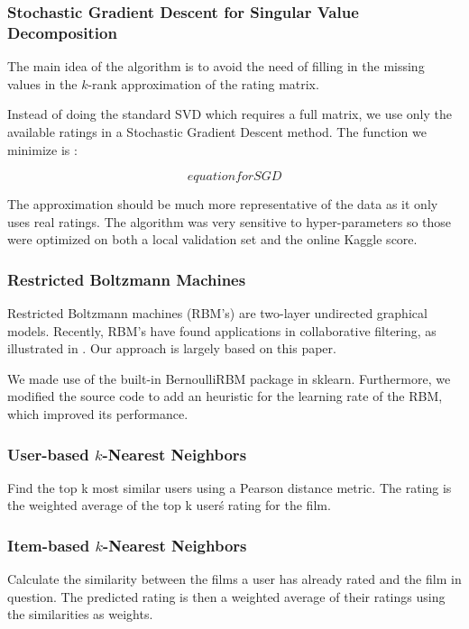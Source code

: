 \documentclass[10pt,conference,compsocconf]{IEEEtran}
\begin{document}
\subsubsection*{\textbf{Stochastic Gradient Descent for Singular Value Decomposition}} The main idea of the algorithm is to avoid the need of filling in the missing values in the $k$-rank approximation of the rating matrix. 

Instead of doing the standard SVD which requires a full matrix, we use only the available ratings in a Stochastic Gradient Descent method. The function we minimize is :

\begin{equation}
equation for SGD
\end{equation}

The approximation should be much more representative of the data as it only uses real ratings. The algorithm was very sensitive to hyper-parameters so those were optimized on both a local validation set and the online Kaggle score. 

\subsubsection*{\textbf{Restricted Boltzmann Machines}}

Restricted Boltzmann machines (RBM's) are two-layer undirected graphical models. Recently, RBM's have found applications in collaborative filtering, as illustrated in \cite{SMH07}. Our approach is largely based on this paper.



We made use of the built-in BernoulliRBM package in sklearn. Furthermore, we modified the source code to add an heuristic for the learning rate of the RBM, which improved its performance.


\subsubsection*{\textbf{User-based $k$-Nearest Neighbors}} Find the top k most similar users using a Pearson distance metric. The rating is the weighted average of the top k user\'s rating for the film.

\subsubsection*{\textbf{Item-based $k$-Nearest Neighbors}}  Calculate the similarity between the films a user has already rated and the film in question. The predicted rating is then a weighted average of their ratings using the similarities as weights.
\end{document}
